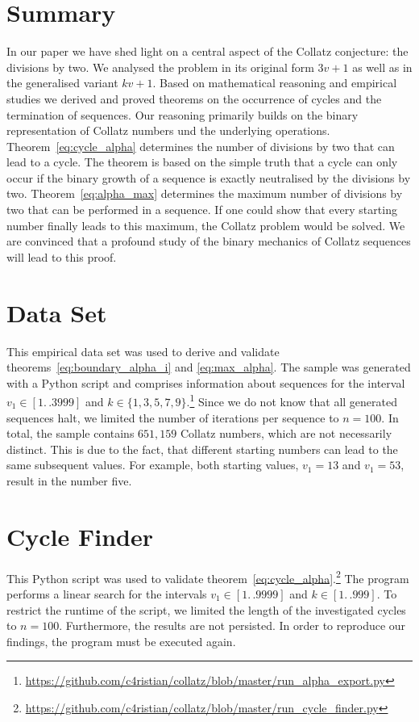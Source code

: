 \documentclass{SciPress_2015}
\begin{document}
\section{Summary}
In our paper we have shed light on a central aspect of the Collatz conjecture: the divisions by two. We analysed the problem in its original form $3v+1$ as well as in the generalised variant $kv+1$. Based on mathematical reasoning and empirical studies we derived and proved theorems on the occurrence of cycles and the termination of sequences. Our reasoning primarily builds on the binary representation of Collatz numbers und the underlying operations. Theorem~\ref{eq:cycle_alpha} determines the number of divisions by two that can lead to a cycle. The theorem is based on the simple truth that a cycle can only occur if the binary growth of a sequence is exactly neutralised by the divisions by two. Theorem~\ref{eq:alpha_max} determines the maximum number of divisions by two that can be performed in a sequence. If one could show that every starting number finally leads to this maximum, the Collatz problem would be solved. We are convinced that a profound study of the binary mechanics of Collatz sequences will lead to this proof.

\appendix
\section{Data Set}
\label{appx:data_set}
This empirical data set was used to derive and validate theorems~\ref{eq:boundary_alpha_i} and \ref{eq:max_alpha}. The sample was generated with a Python script and comprises information about sequences for the interval $v_1\in[1\mathrel{{.}\,{.}}3999]$ and $k\in\{1,3,5,7,9\}$.\footnote{\url{https://github.com/c4ristian/collatz/blob/master/run_alpha_export.py}} Since we do not know that all generated sequences halt, we limited the number of iterations per sequence to $n=100$. In total, the sample contains $651,159$ Collatz numbers, which are not necessarily distinct. This is due to the fact, that different starting numbers can lead to the same subsequent values. For example, both starting values, $v_1=13$ and $v_1=53$, result in the number five.

\section{Cycle Finder}
\label{appx:cycle_finder}
This Python script was used to validate theorem~\ref{eq:cycle_alpha}.\footnote{\url{https://github.com/c4ristian/collatz/blob/master/run_cycle_finder.py}} The program performs a linear search for the intervals $v_1\in[1\mathrel{{.}\,{.}}9999]$ and $k\in[1\mathrel{{.}\,{.}}999]$. To restrict the runtime of the script, we limited the length of the investigated cycles to $n=100$. Furthermore, the results are not persisted. In order to reproduce our findings, the program must be executed again.
\end{document}
